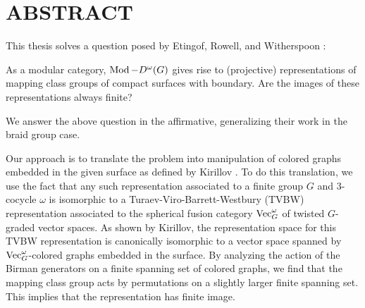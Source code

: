 %
%
%
%

\chapter*{ABSTRACT}

\pagestyle{plain} %
\setcounter{page}{2}

\indent
This thesis solves a question posed by Etingof, Rowell, and Witherspoon \cite{erw}:

\begin{displayquote}
  As a modular category, $\operatorname{Mod}-D^\omega(G)$ gives rise to (projective) representations of mapping class groups of compact surfaces with boundary.  Are the images of these representations always finite?
\end{displayquote}

We answer the above question in the affirmative, generalizing their work in the braid group case.

Our approach is to translate the problem into manipulation of colored graphs embedded in the given surface as defined by Kirillov \cite{kirillovStringNets}. To do this translation, we use the fact that any such representation associated to a finite group $G$ and 3-cocycle $\omega$ is isomorphic to a Turaev-Viro-Barrett-Westbury (TVBW) representation associated to the spherical fusion category $\operatorname{Vec}_G^\omega$ of twisted $G$-graded vector spaces. As shown by Kirillov, the representation space for this TVBW representation is canonically isomorphic to a vector space spanned by $\operatorname{Vec}_G^\omega$-colored graphs embedded in the surface. By analyzing the action of the Birman generators on a finite spanning set of colored graphs, we find that the mapping class group acts by permutations on a slightly larger finite spanning set. This implies that the representation has finite image.

\pagebreak{}
